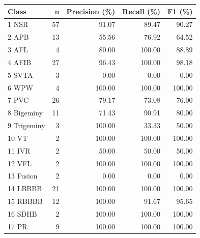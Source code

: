 \begin{tabular}{lrrrr}
\hline
Class & n & Precision (\%) & Recall (\%) & F1 (\%) \\
\hline
1 NSR & 57 & 91.07 & 89.47 & 90.27 \\
2 APB & 13 & 55.56 & 76.92 & 64.52 \\
3 AFL & 4 & 80.00 & 100.00 & 88.89 \\
4 AFIB & 27 & 96.43 & 100.00 & 98.18 \\
5 SVTA & 3 & 0.00 & 0.00 & 0.00 \\
6 WPW & 4 & 100.00 & 100.00 & 100.00 \\
7 PVC & 26 & 79.17 & 73.08 & 76.00 \\
8 Bigeminy & 11 & 71.43 & 90.91 & 80.00 \\
9 Trigeminy & 3 & 100.00 & 33.33 & 50.00 \\
10 VT & 2 & 100.00 & 100.00 & 100.00 \\
11 IVR & 2 & 50.00 & 50.00 & 50.00 \\
12 VFL & 2 & 100.00 & 100.00 & 100.00 \\
13 Fusion & 2 & 0.00 & 0.00 & 0.00 \\
14 LBBBB & 21 & 100.00 & 100.00 & 100.00 \\
15 RBBBB & 12 & 100.00 & 91.67 & 95.65 \\
16 SDHB & 2 & 100.00 & 100.00 & 100.00 \\
17 PR & 9 & 100.00 & 100.00 & 100.00 \\
\hline
\end{tabular}
